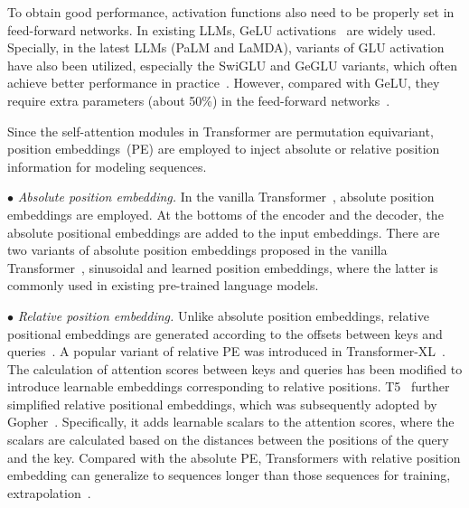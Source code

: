 {{ 

To obtain good performance, activation functions also need to be properly set in feed-forward networks. 
In existing LLMs, GeLU activations~\cite{Dan-arxiv-2016-Gaussian} are widely used. %
Specially, in the latest LLMs (\eg PaLM and LaMDA), variants of GLU activation~\cite{Dauphin-ICML-2017-Language,Shazeer-arxiv-2020-GLU} have also been utilized, especially the SwiGLU and GeGLU variants, which 
often achieve better performance in practice~\cite{Narang-EMNLP-2021-Do}. However, compared with GeLU, they require extra parameters (about 50\%) in the feed-forward networks~\cite{Le-EMNLP-2022-What}.

Since the self-attention modules
in Transformer are permutation equivariant, position embeddings~(PE) are employed to inject absolute or relative position information for modeling sequences. 

{
    $\bullet$ \emph{Absolute position embedding.} In the vanilla Transformer~\cite{Vaswani-NIPS-2017-Attention}, absolute position embeddings are employed. At the bottoms of the encoder and the decoder, the absolute positional embeddings are added to the input embeddings. 
    There are two variants of absolute position embeddings proposed in the vanilla Transformer~\cite{Vaswani-NIPS-2017-Attention}, \ie sinusoidal and learned position embeddings, where the latter is commonly used in existing pre-trained language models. } %

    $\bullet$ \emph{Relative position embedding.} Unlike absolute position embeddings, relative positional embeddings are generated according to the offsets between keys and queries~\cite{shaw-2018-acl-self}.  %
    {A popular variant of relative PE was introduced in Transformer-XL~\cite{dai-2019-acl-transformer,Yang-NeurIPS-2019-xlnet}. The calculation of attention scores between keys and queries has been modified to introduce learnable embeddings corresponding to relative positions.}
 {T5~\cite{Raffel-JMLR-2020-Exploring} further simplified relative positional embeddings, which was subsequently adopted by Gopher~\cite{Rae-arxiv-2021-Scaling}.}
    Specifically, it adds learnable scalars to the attention scores, where the scalars are calculated based on the distances between the positions of the query and the key. Compared with the absolute PE, Transformers with relative position embedding can generalize to sequences longer than those sequences for training, \ie extrapolation~\cite{Press-ICLR-2022-Train}. 

}}
